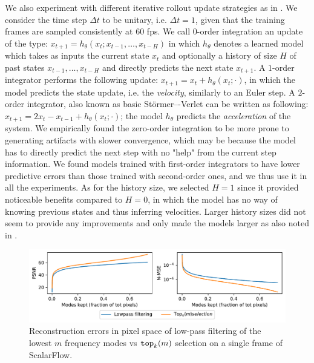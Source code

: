 We also experiment with different iterative rollout update strategies as in \citep{pfaff2020learning}. We consider the time step $\Delta t$ to be unitary, i.e. $\Delta t = 1$, given that the training frames are sampled consistently at 60 fps. We call $0$-order integration an update of the type: $x_{t+1} = h_\theta(x_t; x_{t-1}, \dots, x_{t-H})$ in which $h_\theta$ denotes a learned model which takes as inputs the current state $x_t$ and optionally a history of size $H$ of past states $x_{t-1}, \dots, x_{t-H}$ and directly predicts the next state $x_{t+1}$. A $1$-order integrator performs the following update: $x_{t+1} = x_t + h_\theta(x_t; \cdot)$, in which the model predicts the state update, i.e. the \textit{velocity}, similarly to an Euler step. A $2$-order integrator, also known as basic Störmer–-Verlet \citep{verlet1967computer} can be written as following: $x_{t+1} = 2x_t - x_{t-1} + h_\theta(x_t; \cdot)$; the model $h_\theta$ predicts the \textit{acceleration} of the system. We empirically found the zero-order integration to be more prone to generating artifacts with slower convergence, which may be because the model has to directly predict the next step with no "help" from the current step information. We found models trained with first-order integrators to have lower predictive errors than those trained with second-order ones, and we thus use it in all the experiments. As for the history size, we selected $H=1$ since it provided noticeable benefits compared to $H=0$, in which the model has no way of knowing previous states and thus inferring velocities. Larger history sizes did not seem to provide any improvements and only made the models larger as also noted in \citep{pfaff2020learning}.  

\begin{figure}
    \centering
    \includegraphics[width=\linewidth]{figures/scalarflow_topk.pdf}
    \vspace{-5mm}

    \caption{\footnotesize Reconstruction errors in pixel space of low-pass filtering of the lowest $m$ frequency modes vs ${\tt top}_k(m)$ selection on a single frame of ScalarFlow.}
    \vspace{-5mm}
    \label{fig:sflow_topk}
\end{figure}

